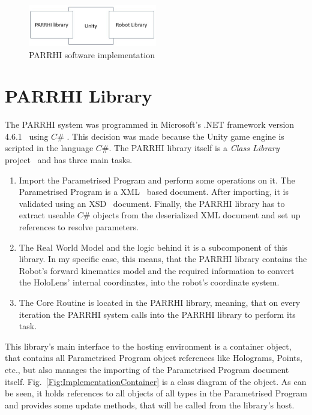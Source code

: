 \begin{figure}[!h]
	\centering
	\includegraphics[width=0.5\textwidth]{Figures/Implementation_SystemSetup.jpg}
	\caption{PARRHI software implementation}
	\label{Fig:Implementation}
\end{figure}

\section{PARRHI Library}
The PARRHI system was programmed in Microsoft's .NET framework version 4.6.1~\cite{NETFramework} using $C\#$ \cite{CSharp}. This decision was made because the Unity game engine is scripted in the language $C\#$. The PARRHI library itself is a \textit{Class Library} project~\cite{ClassLibrary} and has three main tasks.

\begin{enumerate}
	\item Import the Parametrised Program and perform some operations on it. The Parametrised Program is a XML~\cite{xmlW3C} based document. After importing, it is validated using an XSD~\cite{xsdW3C} document. Finally, the PARRHI library has to extract useable $C\#$ objects from the deserialized XML document and set up references to resolve parameters.
	\item The Real World Model and the logic behind it is a subcomponent of this library. In my specific case, this means, that the PARRHI library contains the Robot's forward kinematics model and the required information to convert the HoloLens' internal coordinates, into the robot's coordinate system.
	\item The Core Routine is located in the PARRHI library, meaning, that on every iteration the PARRHI system calls into the PARRHI library to perform its task.
\end{enumerate}

This library's main interface to the hosting environment is a container object, that contains all Parametrised Program object references like Holograms, Points, etc., but also manages the importing of the Parametrised Program document itself. Fig.~\ref{Fig:ImplementationContainer} is a class diagram of the  object. As can be seen, it holds references to all objects of all types in the Parametrised Program and provides some update methods, that will be called from the library's host.

